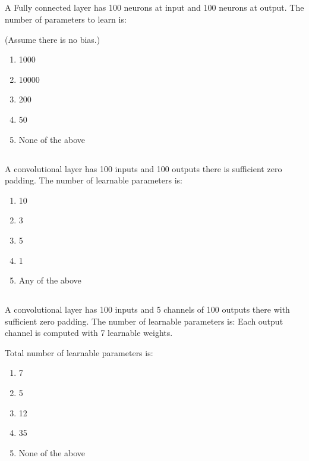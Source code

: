 \begin{frame}
\section{}
A Fully connected layer has 100 neurons at
input and 100 neurons at output. The number of parameters to learn is:

(Assume there is no bias.)
\begin{enumerate}[label=(\Alph*)]
\item 1000
\item 10000   %
\item 200
\item 50
\item None of the above  %
\end{enumerate}
\end{frame}

\begin{frame}
\section{}
A convolutional layer has 100 inputs and
100 outputs there is sufficient zero padding. The
number of learnable parameters is:

\begin{enumerate}[label=(\Alph*)]
\item 10
\item 3
\item 5
\item 1
\item Any of the above   %
\end{enumerate}
\end{frame}

\begin{frame}
\section{}
A convolutional layer has 100 inputs and
5 channels of 100 outputs there with sufficient
zero padding. The number of learnable parameters is:
Each output channel is computed with 7 learnable weights.

Total number of learnable parameters is:

\begin{enumerate}[label=(\Alph*)]
\item 7
\item 5
\item 12
\item 35    %
\item None of the above  %
\end{enumerate}
\end{frame}


